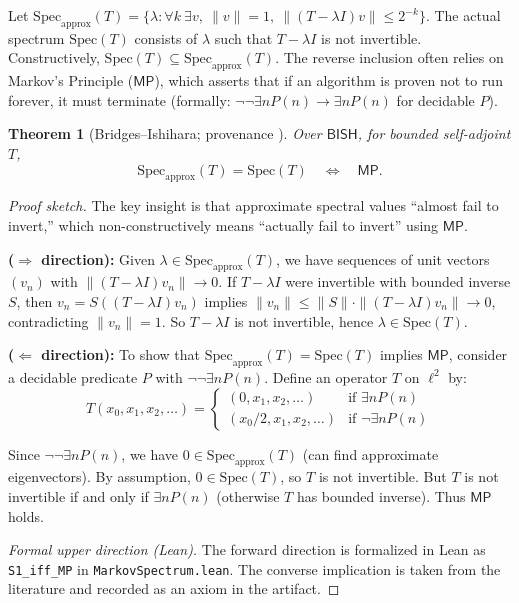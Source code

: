 \documentclass[11pt]{article}
\newcommand{\MP}{\mathsf{MP}}
\newcommand{\lean}[1]{\texttt{#1}}
\newcommand{\leanpartial}{\text{\tiny [Lean-partial]}}
\theoremstyle{plain}
\newtheorem{theorem}{Theorem}[section]
\theoremstyle{definition}
\theoremstyle{remark}
\newenvironment{prfsketch}{\noindent\textit{Proof sketch.} }{}
\newcommand{\BISH}{\mathsf{BISH}}
\begin{document}
Let $\mathrm{Spec}_{\mathrm{approx}}(T)=\{\lambda:\forall k\ \exists v,\ \|v\|=1,\ \|(T-\lambda I)v\|\le 2^{-k}\}$.
The actual spectrum $\mathrm{Spec}(T)$ consists of $\lambda$ such that $T-\lambda I$ is not invertible.
Constructively, $\mathrm{Spec}(T) \subseteq \mathrm{Spec}_{\mathrm{approx}}(T)$. The reverse inclusion often relies on Markov's Principle ($\MP$), which asserts that if an algorithm is proven not to run forever, it must terminate (formally: $\neg\neg\exists n P(n) \to \exists n P(n)$ for decidable $P$).

\begin{theorem}[Bridges--Ishihara; provenance \cite{BridgesRichman}] \leanpartial
Over $\BISH$, for bounded self-adjoint $T$,
\[
\mathrm{Spec}_{\mathrm{approx}}(T)=\mathrm{Spec}(T)\quad \Longleftrightarrow\quad \MP.
\]
\end{theorem}

\begin{prfsketch}
The key insight is that approximate spectral values ``almost fail to invert,'' which non-constructively means ``actually fail to invert'' using $\MP$. 

\textbf{($\Rightarrow$ direction):} Given $\lambda\in\mathrm{Spec}_{\mathrm{approx}}(T)$, we have sequences of unit vectors $(v_n)$ with $\|(T-\lambda I)v_n\| \to 0$. 
If $T-\lambda I$ were invertible with bounded inverse $S$, then $v_n = S((T-\lambda I)v_n)$ implies $\|v_n\| \leq \|S\| \cdot \|(T-\lambda I)v_n\| \to 0$, 
contradicting $\|v_n\|=1$. So $T-\lambda I$ is not invertible, hence $\lambda\in\mathrm{Spec}(T)$.

\textbf{($\Leftarrow$ direction):} To show that $\mathrm{Spec}_{\mathrm{approx}}(T) = \mathrm{Spec}(T)$ implies $\MP$, 
consider a decidable predicate $P$ with $\neg\neg\exists n P(n)$. Define an operator $T$ on $\ell^2$ by:
$$T(x_0, x_1, x_2, \ldots) = \begin{cases}
(0, x_1, x_2, \ldots) & \text{if } \exists n P(n) \\
(x_0/2, x_1, x_2, \ldots) & \text{if } \neg\exists n P(n)
\end{cases}$$

Since $\neg\neg\exists n P(n)$, we have $0 \in \mathrm{Spec}_{\mathrm{approx}}(T)$ (can find approximate eigenvectors).
By assumption, $0 \in \mathrm{Spec}(T)$, so $T$ is not invertible. 
But $T$ is not invertible if and only if $\exists n P(n)$ (otherwise $T$ has bounded inverse). 
Thus $\MP$ holds.
\end{prfsketch}

\begin{proof}[Formal upper direction (Lean)]
The forward direction is formalized in Lean as \lean{S1\_iff\_MP} in \texttt{MarkovSpectrum.lean}.
The converse implication is taken from the literature and recorded as an axiom in the artifact.
\end{proof}
\end{document}
